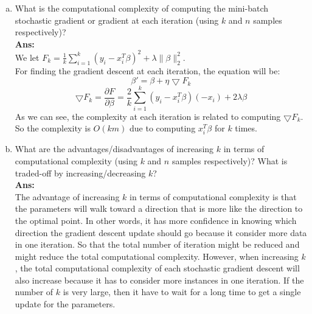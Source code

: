 \documentclass[11pt]{article}
\begin{document}
\begin{enumerate}[(a)]
\item What is the computational complexity of computing the mini-batch stochastic gradient or gradient at each iteration (using $k$ and $n$ samples respectively)?\\
\textbf{Ans:}\\
We let $F_k = \frac{1}{k}\sum_{i=1}^k(y_i - x_i^T\beta)^2 + \lambda\|\beta\|_2^2$.\\
For finding the gradient descent at each iteration, the equation will be:
$$\beta' = \beta + \eta \bigtriangledown F_k$$
$$\bigtriangledown F_k = \frac{\partial F}{\partial \beta} = \frac{2}{k}\sum_{i=1}^{k}(y_i - x_i^T\beta)(-x_i) + 2\lambda\beta$$
As we can see, the complexity at each iteration is related to computing $\bigtriangledown F_k$. So the complexity is $O(km)$ due to computing $x_i^T\beta$ for $k$ times.

\item What are the advantages/disadvantages of increasing $k$ in terms of computational complexity (using $k$ and $n$ samples respectively)? What is traded-off by increasing/decreasing $k$?\\
\textbf{Ans:}\\
The advantage of increasing $k$ in terms of computational complexity is that the parameters will walk toward a direction that is more like the direction to the optimal point. In other words, it has more confidence in knowing which direction the gradient descent update should go because it consider more data in one iteration. So that the total number of iteration might be reduced and might reduce the total computational complexity. However, when increasing $k$, the total computational complexity of each stochastic gradient descent will also increase because it has to consider more instances in one iteration. If the number of $k$ is very large, then it have to wait for a long time to get a single update for the parameters.\\


\end{enumerate}
\end{document}
